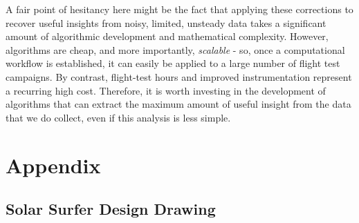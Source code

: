 \documentclass[conf]{new-aiaa}
\begin{document}
    A fair point of hesitancy here might be the fact that applying these corrections to recover useful insights from noisy, limited, unsteady data takes a significant amount of algorithmic development and mathematical complexity. However, algorithms are cheap, and more importantly, \emph{scalable} - so, once a computational workflow is established, it can easily be applied to a large number of flight test campaigns. By contrast, flight-test hours and improved instrumentation represent a recurring high cost. Therefore, it is worth investing in the development of algorithms that can extract the maximum amount of useful insight from the data that we do collect, even if this analysis is less simple.


    \section*{Appendix}

    \newpage

    \subsection{Solar Surfer Design Drawing}
    \label{subsec:solar_surfer_drawing}

    \begin{figure}[H]
        \centering
        \label{fig:solar_surfer_design}
    \end{figure}
\end{document}
